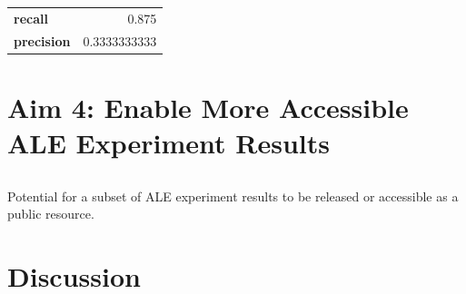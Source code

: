 \documentclass[12pt,final,masters,chapterheads]{ucsd}  %
\begin{document}
\begin{table}[h!]
\centering
\begin{tabular}{ l r }
  \textbf{recall} & 0.875 \\
  \textbf{precision} & 0.3333333333 \\
\end{tabular}
\end{table}

\chapter{Aim 4: Enable More Accessible ALE Experiment Results}
\section{}
Potential for a subset of ALE experiment results to be released or accessible as a public resource.

\chapter{Discussion}

%
%

%
%
%
%

%
%

%
%
\end{document}
